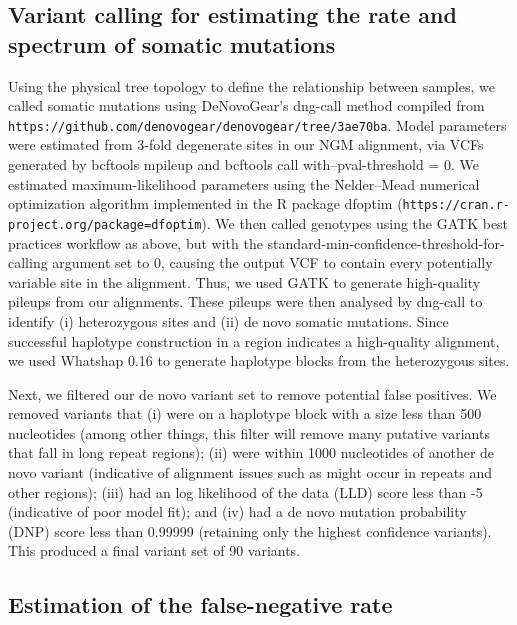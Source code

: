 \subsection{Variant calling for estimating the rate and spectrum of somatic mutations}

Using the physical tree topology to define the relationship between samples, we called somatic mutations using DeNovoGear's dng-call method \parencite{ramu_denovogear_2013} compiled from \texttt{https://github.com/denovogear/denovogear/tree/3ae70ba}. Model parameters were estimated from 3-fold degenerate sites in our NGM alignment, via VCFs generated by bcftools mpileup and bcftools call with--pval-threshold = 0. We estimated maximum-likelihood parameters using the Nelder–Mead numerical optimization algorithm implemented in the R package dfoptim (\texttt{https://cran.r-project.org/package=dfoptim}). We then called genotypes using the GATK best practices workflow as above, but with the standard-min-confidence-threshold-for-calling argument set to 0, causing the output VCF to contain every potentially variable site in the alignment. Thus, we used GATK to generate high-quality pileups from our alignments. These pileups were then analysed by dng-call to identify (i) heterozygous sites and (ii) de novo somatic mutations. Since successful haplotype construction in a region indicates a high-quality alignment, we used Whatshap 0.16 \parencite{martin_whatshap_2016} to generate haplotype blocks from the heterozygous sites.

Next, we filtered our de novo variant set to remove potential false positives. We removed variants that (i) were on a haplotype block with a size less than 500 nucleotides (among other things, this filter will remove many putative variants that fall in long repeat regions); (ii) were within 1000 nucleotides of another de novo variant (indicative of alignment issues such as might occur in repeats and other regions); (iii) had an log likelihood of the data (LLD) score less than -5 (indicative of poor model fit); and (iv) had a de novo mutation probability (DNP) score less than 0.99999 (retaining only the highest confidence variants). This produced a final variant set of 90 variants.

\subsection{Estimation of the false-negative rate}


